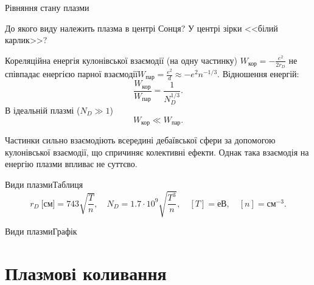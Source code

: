 \documentclass[]{beamer}
\begin{document}
\begin{frame}{Рівняння стану плазми}{}
\begin{overprint}
		\begin{exampleblock}{}
			До якого виду належить плазма в центрі Сонця? У центрі зірки <<білий карлик>>?
		\end{exampleblock}
		\begin{alertblock}{}\justifying\scriptsize
			Кореляційна енергія кулонівської взаємодії (на одну частинку) $ W_\text{кор} = -\frac{e^2}{2r_D} $ не співпадає енергією парної взаємодії$ W_\text{пар} = \frac{e^2}{d} \approx - e^2n^{-1/3} $. Відношення енергій:
			\begin{equation*}
				\frac{W_\text{кор}}{W_\text{пар}} = \frac1{N_D^{1/3}}.
			\end{equation*}
			В ідеальній плазмі ($N_D \gg 1$)
			\begin{equation*}
				W_\text{кор} \ll W_\text{пар}.
			\end{equation*}
		\end{alertblock}
		\begin{block}{}\justifying\scriptsize
			Частинки сильно взаємодіють \alert{всередині дебаївської сфери} за допомогою кулонівської взаємодії, що спричиняє колективні ефекти. Однак така взаємодія на енергію плазми впливає не суттєво.
		\end{block}
	\end{overprint}
\end{frame}

\begin{frame}{Види плазми}{Таблиця}
	\begin{equation*}
		r_D\ \text{[см]} = 743\sqrt{\frac{T}{n}}, \quad N_D = 1.7\cdot10^9\sqrt{\frac{T^3}{n}},\quad [T] = \text{еВ},\quad [n] = \text{см}^{-3}.
	\end{equation*}
	\begin{center}
		
	\end{center}
\end{frame}

\begin{frame}{Види плазми}{Графік}
	\begin{center}
		
	\end{center}
\end{frame}

\section{Плазмові коливання}
\end{document}
